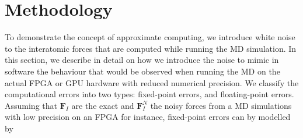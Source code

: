 \documentclass[format=acmsmall,review,timestamp,urlbreakonhyphens]{acmart}
\begin{document}
\section{Methodology}
\label{sec:methodology}
To demonstrate the concept of approximate computing, we introduce white noise to the interatomic forces that are computed while running the MD simulation. In this section, we describe in detail on how we introduce the noise to mimic in software the behaviour that would be observed when running the MD on the actual FPGA or GPU hardware with reduced numerical precision. We classify the computational errors into two types: fixed-point errors, and floating-point errors. Assuming that $\textbf{F}_{I}$ are the exact and $\textbf{F}_{I}^{N}$ the noisy forces from a MD simulations with low precision on an FPGA for instance, fixed-point errors can by modelled by
\end{document}
